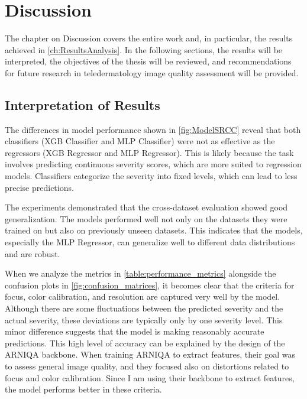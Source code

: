 \chapter{Discussion}
\label{ch:Discussion}
The chapter on Discussion covers the entire work and, in particular, the results achieved in \autoref{ch:ResultsAnalysis}. In the following sections, the results will be interpreted, the objectives of the thesis will be reviewed, and recommendations for future research in teledermatology image quality assessment will be provided. \par
\section{Interpretation of Results}
\label{sec:InterpretationResults}
The differences in model performance shown in \autoref{fig:ModelSRCC} reveal that both classifiers (XGB Classifier and MLP Classifier) were not as effective as the regressors (XGB Regressor and MLP Regressor). This is likely because the task involves predicting continuous severity scores, which are more suited to regression models. Classifiers categorize the severity into fixed levels, which can lead to less precise predictions.\par {}
\vspace{\baselineskip}
\noindent
The experiments demonstrated that the cross-dataset evaluation showed good generalization. The models performed well not only on the datasets they were trained on but also on previously unseen datasets. This indicates that the models, especially the MLP Regressor, can generalize well to different data distributions and are robust.\par
\vspace{\baselineskip}
\noindent
When we analyze the metrics in \autoref{table:performance_metrics} alongside the confusion plots in \autoref{fig:confusion_matrices}, it becomes clear that the criteria for focus, color calibration, and resolution are captured very well by the model. Although there are some fluctuations between the predicted severity and the actual severity, these deviations are typically only by one severity level. This minor difference suggests that the model is making reasonably accurate predictions. This high level of accuracy can be explained by the design of the ARNIQA backbone. When training ARNIQA to extract features, their goal was to assess general image quality, and they focused also on distortions related to focus and color calibration. Since I am using their backbone to extract features, the model performs better in these criteria.\par
